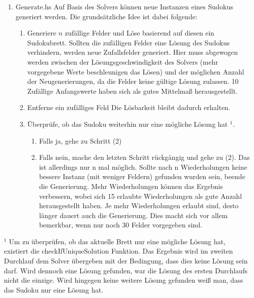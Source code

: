 \begin{enumerate}[(1)]
    \item Generate.hs \newline
    Auf Basis des Solvers können neue Instanzen eines Sudokus generiert werden. Die grundsätzliche Idee ist dabei folgende:
        \begin{enumerate}[(1)]
            \item Generiere \(n\) zufällige Felder und Löse basierend auf diesen ein Sudokubrett. \newline
            Sollten die zufälligen Felder eine Lösung des Sudokus verhindern, werden neue Zufallsfelder generiert. Hier muss abgewogen werden zwischen der Lösungsgeschwindigkeit des Solvers (mehr vorgegebene Werte beschleunigen das Lösen) und der möglichen Anzahl der Neugenerierungen, da die Felder keine gültige Lösung zulassen. 10 Zufällige Anfangswerte haben sich als gutes Mittelmaß herausgestellt.
            \item Entferne ein zufälliges Feld \newline
            Die Lösbarkeit bleibt dadurch erhalten.
            \item Überprüfe, ob das Sudoku weiterhin nur eine mögliche Lösung hat $^1$.
            \begin{enumerate}
                \item Falls ja, gehe zu Schritt (2)
                \item Falls nein, mache den letzten Schritt rückgängig und gehe zu (2). \newline
                Das ist allerdings nur n mal möglich. Sollte nach n Wiederholungen keine bessere Instanz (mit weniger Feldern) gefunden wurden sein, beende die Generierung. Mehr Wiederholungen können das Ergebnis verbessern, wobei sich 15 erlaubte Wiederholungen als gute Anzahl herausgestellt haben. Je mehr Wiederholungen erlaubt sind, desto länger dauert auch die Generierung. Dies macht sich vor allem bemerkbar, wenn nur noch 30 Felder vorgegeben sind.
            \end{enumerate}
        \end{enumerate}
\end{enumerate}
$^1$ Um zu überprüfen, ob das aktuelle Brett nur eine mögliche Lösung hat, existiert die checkIfUniqueSolution Funktion. Das Ergebnis wird im zweiten Durchlauf dem Solver übergeben mit der Bedingung, dass dies keine Lösung sein darf. Wird dennoch eine Lösung gefunden, war die Lösung des ersten Durchlaufs nicht die einzige. Wird hingegen keine weitere Lösung gefunden weiß man, dass das Sudoku nur eine Lösung hat.

